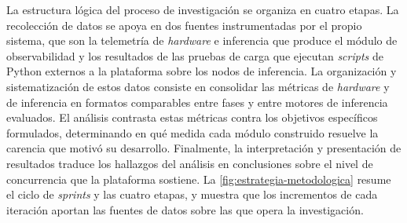 La estructura lógica del proceso de investigación se organiza en cuatro etapas. La recolección de datos se apoya en dos fuentes instrumentadas por el propio sistema, que son la telemetría de \emph{hardware} e inferencia que produce el módulo de observabilidad y los resultados de las pruebas de carga que ejecutan \emph{scripts} de Python externos a la plataforma sobre los nodos de inferencia. La organización y sistematización de estos datos consiste en consolidar las métricas de \emph{hardware} y de inferencia en formatos comparables entre fases y entre motores de inferencia evaluados. El análisis contrasta estas métricas contra los objetivos específicos formulados, determinando en qué medida cada módulo construido resuelve la carencia que motivó su desarrollo. Finalmente, la interpretación y presentación de resultados traduce los hallazgos del análisis en conclusiones sobre el nivel de concurrencia que la plataforma sostiene. La \cref{fig:estrategia-metodologica} resume el ciclo de \emph{sprints} y las cuatro etapas, y muestra que los incrementos de cada iteración aportan las fuentes de datos sobre las que opera la investigación.


